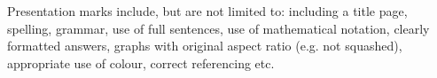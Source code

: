 \documentclass[11pt]{exam}
\begin{document}
\begin{questions}

\begin{solution}[5mm] %
Presentation marks include, but are not limited to: including a title
page, spelling, grammar, use of full sentences, use of mathematical
notation, clearly formatted answers, graphs with original aspect ratio
(e.g. not squashed), appropriate use of colour, correct referencing
etc.
\end{solution}

%
% 
%
%

\end{questions}
\nomorequestions
\end{document}
